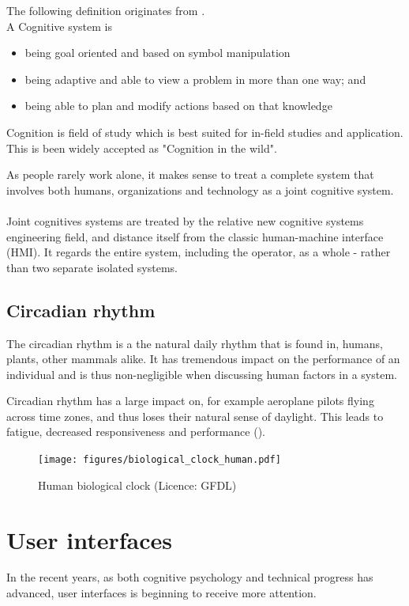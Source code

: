 \documentclass[10pt,oneside]{book}                  %
\begin{document}
The following definition originates from \cite{hollnagel2005joint}.\\
A Cognitive system is
\begin{itemize}
  \item being goal oriented and based on symbol manipulation
  \item being adaptive and able to view a problem in more than one way; and
  \item being able to plan and modify actions based on that knowledge
\end{itemize}
Cognition is field of study which is best suited for in-field studies and application. This is been widely accepted as "Cognition in the wild".

As people rarely work alone, it makes sense to treat a complete system that involves both humans, organizations and technology as a joint cognitive system. \cite{hollnagel2005joint}\\
\\
Joint cognitives systems are treated by the relative new cognitive systems engineering field, and distance itself from the classic human-machine interface (HMI). It regards the entire system, including the operator, as a whole - rather than two separate isolated systems.
\subsection{Circadian rhythm}
The circadian rhythm is a the natural daily rhythm that is found in, humans, plants, other mammals alike. It has tremendous impact on the performance of an individual and is thus non-negligible when discussing human factors in a system.

Circadian rhythm has a large impact on, for example aeroplane pilots flying across time zones, and thus loses their natural sense of daylight. This leads to fatigue, decreased responsiveness and performance (\cite{mallis2010aircrew}).
\begin{figure}[h]
 \centering
   \texttt{[image: figures/biological\_clock\_human.pdf]}
 \caption{Human biological clock (Licence: GFDL)}
 \label{fig:human_biological_clock}
\end{figure}

\section{User interfaces}
In the recent years, as both cognitive psychology and technical progress has advanced, user interfaces is beginning to receive more attention. 
\end{document}
